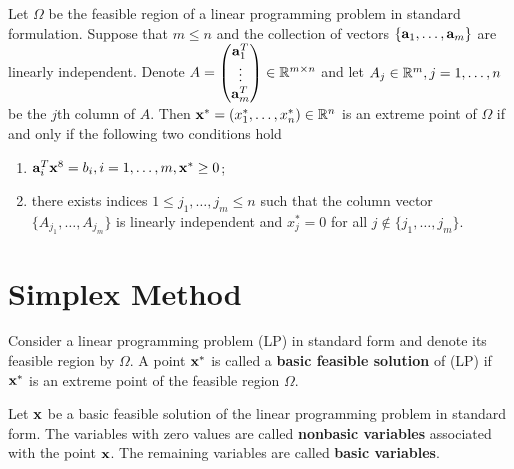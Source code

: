 \begin{theorem}
    Let \(\Omega\) be the feasible region of a linear programming problem in standard formulation. Suppose that \(m \leq n\) and the collection of vectors \(\{\mathbf{a}_1, \dots, \mathbf{a}_m\}\) are linearly independent. Denote \(A = \begin{pmatrix}
        \mathbf{a}_1^T \\ \vdots \\ \mathbf{a}_m^T
    \end{pmatrix} \in \mathbb{R}^{m \times n}\) and let \(A_j \in \mathbb{R}^m, j = 1, \dots, n\) be the \(j\)th column of \(A\). Then \(\mathbf{x}^* = (x_1^*, \dots, x_n^*) \in \mathbb{R}^n\) is an extreme point of \(\Omega\) if and only if the  following two conditions hold
    \begin{enumerate}[label=(\arabic*)]
        \item \(\mathbf{a}_i^T \mathbf{x}^8 = b_i, i = 1, \dots, m, \mathbf{x}^* \geq 0\);
        \item there exists indices \(1 \leq j_1, \dots, j_m \leq n\) such that the column vector \(\{A_{j_1}, \dots, A_{j_m}\}\) is linearly independent and \(x_j^* = 0\) for all \(j \notin \{j_1, \dots, j_m\}\).
    \end{enumerate}
\end{theorem}

\section{Simplex Method}

\begin{definition}
    Consider a linear programming problem (LP) in standard form and denote its feasible region by \(\Omega\). A point \(\mathbf{x}^*\) is called a \textbf{basic feasible solution} of (LP) if \(\mathbf{x}^*\) is an extreme point of the feasible region \(\Omega\).
\end{definition}

\begin{definition}
    Let \(\mathbf{x}\) be a basic feasible solution of the linear programming problem in standard form. The variables with zero values are called \textbf{nonbasic variables} associated with the point \(\mathbf{x}\). The remaining variables are called \textbf{basic variables}.
\end{definition}

